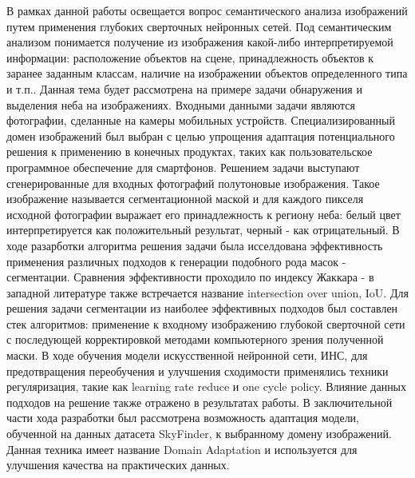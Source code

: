 





\Intro

В рамках данной работы освещается вопрос семантического анализа изображений путем применения глубоких сверточных нейронных сетей. Под семантическим анализом понимается получение из изображения какой-либо интерпретируемой информации: расположение объектов на сцене, принадлежность объектов к заранее заданным классам, наличие на изображении объектов определенного типа и т.п.. Данная тема будет рассмотрена на примере задачи обнаружения и выделения неба на изображениях. Входными данными задачи являются фотографии, сделанные на камеры мобильных устройств. Специализированный домен изображений был выбран с целью упрощения адаптация потенциального решения к применению в конечных продуктах, таких как пользовательское программное обеспечение для смартфонов. Решением задачи выступают сгенерированные для входных фотографий полутоновые изображения. Такое изображение называется сегментационной маской и для каждого пикселя исходной фотографии выражает его принадлежность к региону неба: белый цвет интерпретируется как положительный результат, черный - как отрицательный. В ходе разарботки алгоритма решения задачи была исселдована эффективность применения различных подходов к генерации подобного рода масок - сегментации. Сравнения эффективности проходило по индексу Жаккара - в западной литературе также встречается название intersection over union, IoU. Для решения задачи сегментации из наиболее эффективных подходов был составлен стек алгоритмов: применение к входному изображению глубокой сверточной сети с последующей корректировкой методами компьютерного зрения полученной маски. В ходе обучения модели искусственной нейронной сети, ИНС, для предотвращения переобучения и улучшения сходимости применялись техники регуляризация, такие как learning rate reduce и one cycle policy. Влияние данных подходов на решение также отражено в результатах работы. В заключительной части хода разработки был рассмотрена возможность адаптация модели, обученной на данных датасета SkyFinder, к выбранному домену изображений. Данная техника имеет название Domain Adaptation и используется для улучшения качества на практических данных.

